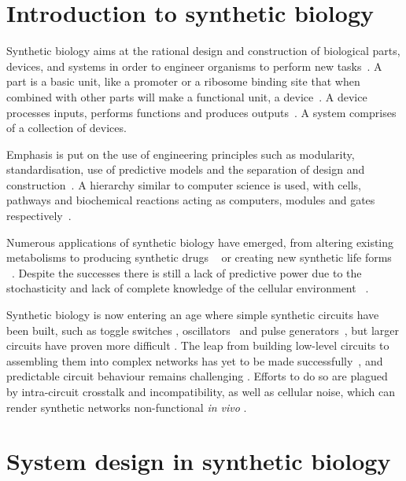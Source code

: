 
\section{Introduction to synthetic biology}

Synthetic biology aims at the rational design and construction of biological parts, devices, and systems in order to engineer organisms to perform new tasks~\autocite{Lu:2009ez,Andrianantoandro:2006bi}. A part is a basic unit, like a promoter or a ribosome binding site that when combined with other parts will make a functional unit, a device~\autocite{Heinemann:2006ht}. A device processes inputs, performs functions and produces outputs~\autocite{Andrianantoandro:2006bi}. A system comprises of a collection of devices.     

Emphasis is put on the use of engineering principles such as modularity, standardisation, use of predictive models and the separation of design and construction~\autocite{Agapakis:2009bt, Heinemann:2006ht}. A hierarchy similar to computer science is used, with cells, pathways and biochemical reactions acting as computers, modules and gates respectively~\autocite{Andrianantoandro:2006bi}. 
       
Numerous applications of synthetic biology have emerged, from altering existing metabolisms to producing synthetic drugs ~\autocite{Holtz:2010bm} or creating new synthetic life forms ~\autocite{Agapakis:2009bt}. Despite the successes there is still a lack of predictive power due to the stochasticity and lack of complete knowledge of the cellular environment ~\autocite{Andrianantoandro:2006bi}.

Synthetic biology is now entering an age where simple synthetic circuits have been built, such as toggle switches \autocite{Gardner:2000vha, Kramer:2004kq, Isaacs:2003ht, Ham:2008hh, Deans:2007cya, Friedland:2009ce}, oscillators~\autocite{Stricker:2008jqa, Fung:2005jd, Tigges:2009jx} and pulse generators~\autocite{Basu:2004gn}, but larger circuits have proven more difficult \autocite{XXX}. The leap from building low-level circuits to assembling them into complex networks has yet to be made successfully~\autocite{Lu:2009ez}, and predictable circuit behaviour remains challenging \autocite{XXX}. Efforts to do so are plagued by intra-circuit crosstalk and incompatibility, as well as cellular noise, which can render synthetic networks non-functional \textit{in vivo} \autocite{XXX}. 

\section{System design in synthetic biology}

